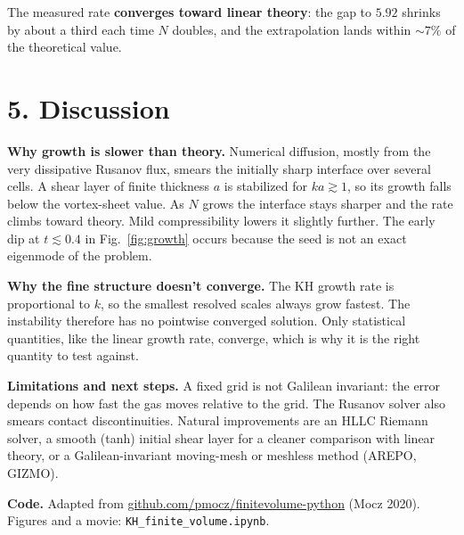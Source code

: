 \documentclass[11pt]{article}
\begin{document}
The measured rate \textbf{converges toward linear theory}: the gap to $5.92$ shrinks by about a third each time $N$ doubles, and the extrapolation lands within ${\sim}7\%$ of the theoretical value.

\section{5. Discussion}
\textbf{Why growth is slower than theory.} Numerical diffusion, mostly from the very dissipative Rusanov flux, smears the initially sharp interface over several cells. A shear layer of finite thickness $a$ is stabilized for $ka\gtrsim1$, so its growth falls below the vortex-sheet value. As $N$ grows the interface stays sharper and the rate climbs toward theory. Mild compressibility lowers it slightly further. The early dip at $t\lesssim0.4$ in Fig.~\ref{fig:growth} occurs because the seed is not an exact eigenmode of the problem.

\textbf{Why the fine structure doesn't converge.} The KH growth rate is proportional to $k$, so the smallest resolved scales always grow fastest. The instability therefore has no pointwise converged solution. Only statistical quantities, like the linear growth rate, converge, which is why it is the right quantity to test against.

\textbf{Limitations and next steps.} A fixed grid is not Galilean invariant: the error depends on how fast the gas moves relative to the grid. The Rusanov solver also smears contact discontinuities. Natural improvements are an HLLC Riemann solver, a smooth (tanh) initial shear layer for a cleaner comparison with linear theory, or a Galilean-invariant moving-mesh or meshless method (AREPO, GIZMO).


{\small\textbf{Code.} Adapted from \href{https://github.com/pmocz/finitevolume-python}{github.com/pmocz/finitevolume-python} (Mocz 2020). Figures and a movie: \texttt{KH\_finite\_volume.ipynb}.}
\end{document}
